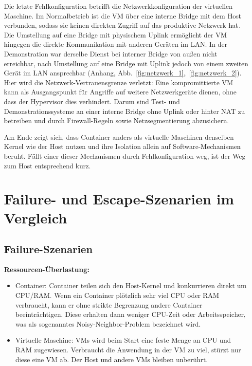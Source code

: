 \documentclass[conference]{IEEEtran}
\begin{document}
Die letzte Fehlkonfiguration betrifft die Netzwerkkonfiguration der virtuellen Maschine.
Im Normalbetrieb ist die VM über eine interne Bridge mit dem Host verbunden, sodass sie keinen direkten Zugriff auf das produktive Netzwerk hat. 
Die Umstellung auf eine Bridge mit physischem Uplink ermöglicht der VM hingegen die direkte Kommunikation mit anderen Geräten im LAN. 
In der Demonstration war derselbe Dienst bei interner Bridge von außen nicht erreichbar, nach Umstellung auf eine Bridge mit Uplink 
jedoch von einem zweiten Gerät im LAN ansprechbar (Anhang, Abb.~\ref{fig:netzwerk_1},~\ref{fig:netzwerk_2}).
Hier wird die Netzwerk-Vertrauensgrenze verletzt: Eine kompromittierte VM kann als Ausgangspunkt für Angriffe auf weitere Netzwerkgeräte dienen, ohne dass der Hypervisor dies verhindert.
Darum sind Test- und Demonstrationssysteme an einer interne Bridge ohne Uplink oder hinter NAT zu betreiben und durch Firewall-Regeln sowie Netzsegmentierung abzusichern.

Am Ende zeigt sich, dass Container anders als virtuelle Maschinen denselben Kernel wie der Host nutzen und ihre Isolation allein auf Software-Mechanismen beruht. 
Fällt einer dieser Mechanismen durch Fehlkonfiguration weg, ist der Weg zum Host entsprechend kurz.

\section{Failure- und Escape-Szenarien im Vergleich}
\label{sec:falure_scenario}
 
\subsection{Failure-Szenarien}
 
\textbf{Ressourcen-Überlastung:}
\begin{itemize}
    \item Container: 
    Container teilen sich den Host-Kernel und konkurrieren direkt um CPU/RAM.
    Wenn ein Container plötzlich sehr viel CPU oder RAM verbraucht, kann er ohne strikte Begrenzung andere Container beeinträchtigen.
    Diese erhalten dann weniger CPU-Zeit oder Arbeitsspeicher, was als sogenanntes \glqq Noisy-Neighbor\grqq{}-Problem bezeichnet wird.
    \item Virtuelle Maschine: 
    VMs wird beim Start eine feste Menge an CPU und RAM zugewiesen.
    Verbraucht die Anwendung in der VM zu viel, stürzt nur diese eine VM ab. Der Host und andere VMs bleiben unberührt.
\end{itemize}
 
\end{document}
